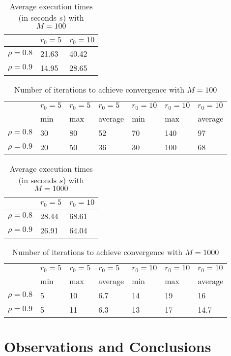 \documentclass[a4paper,11pt,openright]{report}
\begin{document}
\begin{table}[H]
\centering
\addtolength{\leftskip}{-1.5cm}
\addtolength{\rightskip}{-1.5cm}
\begin{tabular}{|c|ll|}
\hline
$ $ & $r_0 = 5$ & $r_0 = 10$ \\
\hline
$\rho = 0.8$ & 21.63 & 40.42 \\
$\rho = 0.9$ & 14.95 & 28.65 \\
\hline
\end{tabular}
\caption{Average execution times (in seconds $s$) with $M = 100$}
\end{table}
\begin{table}[H]
\centering
\addtolength{\leftskip}{-1.5cm}
\addtolength{\rightskip}{-1.5cm}
\begin{tabular}{|c|llllll|}
\hline
$ $ & $r_0 = 5$ & $r_0 = 5$ & $r_0 = 5$ & $r_0 = 10$ & $r_0 = 10$ & $r_0 = 10$ \\
$ $ & min & max & average & min & max & average \\
\hline
$\rho = 0.8$ & 30 & 80 & 52 & 70 & 140 & 97 \\
$\rho = 0.9$ & 20 & 50 & 36 & 30 & 100 & 68 \\
\hline
\end{tabular}
\caption{Number of iterations to achieve convergence with $M = 100$}
\end{table}
\begin{table}[H]
\centering
\addtolength{\leftskip}{-1.5cm}
\addtolength{\rightskip}{-1.5cm}
\begin{tabular}{|c|ll|}
\hline
$ $ & $r_0 = 5$ & $r_0 = 10$ \\
\hline
$\rho = 0.8$ & 28.44 & 68.61 \\
$\rho = 0.9$ & 26.91 & 64.04 \\
\hline
\end{tabular}
\caption{Average execution times (in seconds $s$) with $M = 1000$}
\end{table}
\begin{table}[H]
\centering
\addtolength{\leftskip}{-1.5cm}
\addtolength{\rightskip}{-1.5cm}
\begin{tabular}{|c|llllll|}
\hline
$ $ & $r_0 = 5$ & $r_0 = 5$ & $r_0 = 5$ & $r_0 = 10$ & $r_0 = 10$ & $r_0 = 10$ \\
$ $ & min & max & average & min & max & average \\
\hline
$\rho = 0.8$ & 5 & 10 & 6.7 & 14 & 19 & 16 \\
$\rho = 0.9$ & 5 & 11 & 6.3 & 13 & 17 & 14.7 \\
\hline
\end{tabular}
\caption{Number of iterations to achieve convergence with $M = 1000$}
\end{table}











\section{Observations and Conclusions}
\end{document}
